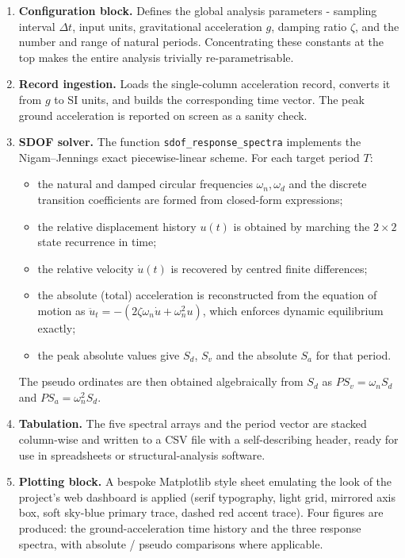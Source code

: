 \documentclass[11pt,a4paper]{article}
\begin{document}
\begin{enumerate}[leftmargin=1.4em,itemsep=0.2em]
  \item \textbf{Configuration block.} Defines the global analysis
        parameters - sampling interval $\Delta t$, input units,
        gravitational acceleration $g$, damping ratio $\zeta$, and
        the number and range of natural periods. Concentrating these
        constants at the top makes the entire analysis trivially
        re-parametrisable.
  \item \textbf{Record ingestion.} Loads the single-column
        acceleration record, converts it from $g$ to SI units, and
        builds the corresponding time vector. The peak ground
        acceleration is reported on screen as a sanity check.
  \item \textbf{SDOF solver.} The function
        \texttt{sdof\_response\_spectra} implements the
        Nigam--Jennings exact piecewise-linear scheme. For each
        target period $T$:
        \begin{itemize}[leftmargin=1.4em,itemsep=0.1em]
          \item the natural and damped circular frequencies
                $\omega_n, \omega_d$ and the discrete transition
                coefficients are formed from closed-form expressions;
          \item the relative displacement history $u(t)$ is obtained
                by marching the $2\times 2$ state recurrence in time;
          \item the relative velocity $\dot{u}(t)$ is recovered by
                centred finite differences;
          \item the absolute (total) acceleration is reconstructed
                from the equation of motion as
                $\ddot{u}_t = -(2\zeta\omega_n\dot{u} + \omega_n^2 u)$,
                which enforces dynamic equilibrium exactly;
          \item the peak absolute values give $S_d$, $S_v$ and the
                absolute $S_a$ for that period.
        \end{itemize}
        The pseudo ordinates are then obtained algebraically from
        $S_d$ as $PS_v = \omega_n S_d$ and $PS_a = \omega_n^2 S_d$.
  \item \textbf{Tabulation.} The five spectral arrays and the period
        vector are stacked column-wise and written to a CSV file with
        a self-describing header, ready for use in spreadsheets or
        structural-analysis software.
  \item \textbf{Plotting block.} A bespoke Matplotlib style sheet
        emulating the look of the project's web dashboard is applied
        (serif typography, light grid, mirrored axis box, soft
        sky-blue primary trace, dashed red accent trace). Four
        figures are produced: the ground-acceleration time history
        and the three response spectra, with absolute / pseudo
        comparisons where applicable.
\end{enumerate}
\end{document}

